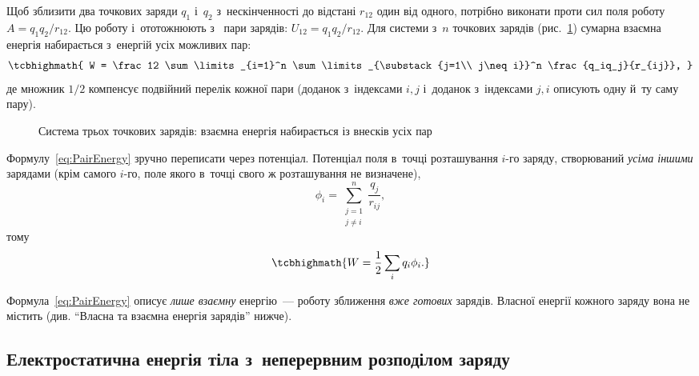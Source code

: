 Щоб зблизити два точкових заряди $q_1$ і~$q_2$ з~нескінченності до відстані $r_{12}$ один
від одного, потрібно виконати проти сил поля роботу $A = q_1q_2/r_{12}$. Цю роботу
і~ототожнюють з~ пари зарядів: $U_{12} = q_1q_2/r_{12}$. Для
системи з~$n$ точкових зарядів (рис.~\ref{pic:ChargesTriangle}) сумарна взаємна енергія
набирається з~енергій усіх можливих пар:
\begin{equation}\label{eq:PairEnergy}
	\tcbhighmath{
		W = \frac12 \sum\limits_{i=1}^n \sum\limits_{\substack{j=1\\ j\neq i}}^n \frac{q_iq_j}{r_{ij}},
	}
\end{equation}
де множник $1/2$ компенсує подвійний перелік кожної пари (доданок з~індексами $i,j$
і~доданок з~індексами $j,i$ описують одну й~ту саму пару).

\begin{figure}\centering
	\caption{Система трьох точкових зарядів: взаємна енергія набирається із внесків усіх
	пар\label{pic:ChargesTriangle}}
\end{figure}

Формулу~\eqref{eq:PairEnergy} зручно переписати через потенціал. Потенціал поля в~точці
розташування $i$-го заряду, створюваний \emph{усіма іншими} зарядами (крім самого $i$-го,
поле якого в~точці свого ж розташування не визначене),
\begin{equation*}
	\phi_i = \sum\limits_{\substack{j=1 \\ j \neq i}}^n \frac{q_j}{r_{ij}},
\end{equation*}
тому
\begin{equation}\label{eq:SystemEnergyViaPotential}
	\tcbhighmath{
		W = \frac12 \sum\limits_i q_i \phi_i.
	}
\end{equation}

\begin{Attention}
	Формула~\eqref{eq:PairEnergy} описує \emph{лише взаємну} енергію~--- роботу зближення
	\emph{вже готових} зарядів. Власної енергії кожного заряду вона не містить (див.
	\enquote{Власна та взаємна енергія зарядів} нижче).
\end{Attention}


\subsection*{Електростатична енергія тіла з~неперервним розподілом заряду}




